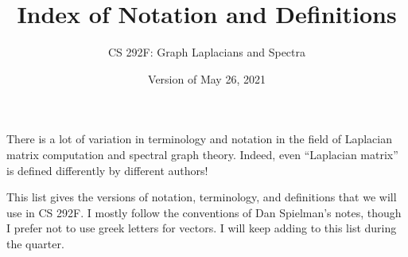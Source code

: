 \documentclass[11pt]{article}
\begin{document}
\title{Index of Notation and Definitions}
\author{CS 292F: Graph Laplacians and Spectra}
\date{Version of May 26, 2021}
\maketitle

There is a lot of variation in terminology and notation in
the field of Laplacian matrix computation and spectral graph 
theory.  
Indeed, even ``Laplacian matrix'' is defined differently by
different authors!

This list gives the versions of notation, terminology, and definitions 
that we will use in CS 292F.
I mostly follow the conventions of Dan Spielman's notes, 
though I prefer not to use greek letters for vectors.
I will keep adding to this list during the quarter.
\end{document}
